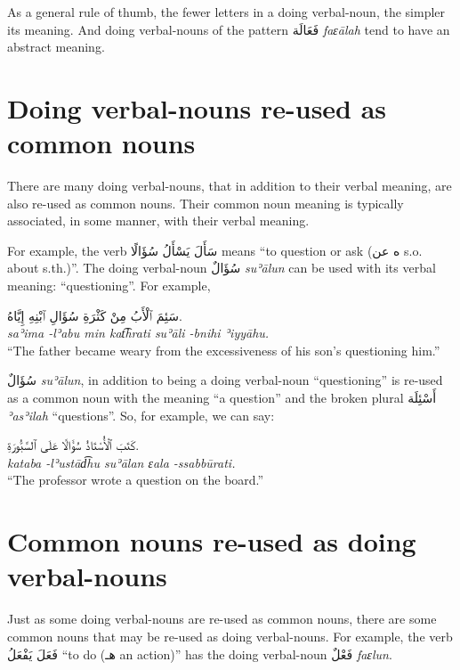 \documentclass[
  10pt,
]{book}
\begin{document}
As a general rule of thumb, the fewer letters in a doing verbal-noun, the simpler its meaning. And doing verbal-nouns of the pattern \foreignlanguage{arabic}{فَعَالَة} \emph{faɛālah} tend to have an abstract meaning.

\section{Doing verbal-nouns re-used as common nouns}\label{doing-verbal-nouns-re-used-as-common-nouns}

There are many doing verbal-nouns, that in addition to their verbal meaning, are also re-used as common nouns. Their common noun meaning is typically associated, in some manner, with their verbal meaning.

For example, the verb \foreignlanguage{arabic}{سَأَلَ يَسْأَلُ سُؤَالًا} means \enquote{to question or ask (\foreignlanguage{arabic}{ه عن} s.o. about s.th.)}. The doing verbal-noun \foreignlanguage{arabic}{سُؤَالٌ} \emph{suʾālun} can be used with its verbal meaning: \enquote{questioning}. For example,

\foreignlanguage{arabic}{سَئِمَ ٱلْأَبُ مِنْ کَثْرَةِ سُؤَالِ ٱبْنِهِ إِيَّاهُ.}\\
\emph{saʾima -lʾabu min kat͡hrati suʾāli -bnihi ʾiyyāhu.}\\
\enquote{The father became weary from the excessiveness of his son's questioning him.}

\foreignlanguage{arabic}{سُؤَالٌ} \emph{suʾālun}, in addition to being a doing verbal-noun \enquote{questioning} is re-used as a common noun with the meaning \enquote{a question} and the broken plural \foreignlanguage{arabic}{أَسْئِلَة} \emph{ʾasʾilah} \enquote{questions}. So, for example, we can say:

\foreignlanguage{arabic}{کَتَبَ ٱلْأُسْتَاذُ سُؤَالًا عَلَى ٱلسَّبُّورَةِ.}\\
\emph{kataba -lʾustād͡hu suʾālan ɛala -ssabbūrati.}\\
\enquote{The professor wrote a question on the board.}

\section{Common nouns re-used as doing verbal-nouns}\label{common-nouns-re-used-as-doing-verbal-nouns}

Just as some doing verbal-nouns are re-used as common nouns, there are some common nouns that may be re-used as doing verbal-nouns. For example, the verb \foreignlanguage{arabic}{فَعَلَ يَفْعَلُ} \enquote{to do (\foreignlanguage{arabic}{هـ} an action)} has the doing verbal-noun \foreignlanguage{arabic}{فَعْلٌ} \emph{faɛlun}.
\end{document}
